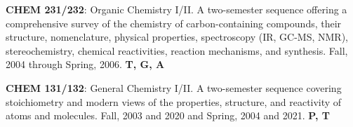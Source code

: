 \documentclass[10pt]{article}
\newcommand*\teitem[4]{\textbf{#1}: #2 #3 \textbf{#4}}
\newcommand*\lectitem[2]{\textbf{#1} #2}
\begin{document}

\teitem{CHEM 231/232}{Organic Chemistry I/II. A two-semester sequence offering a comprehensive survey of the chemistry of carbon-containing compounds, their structure, nomenclature, physical properties, spectroscopy (IR, GC-MS, NMR), stereochemistry, chemical reactivities, reaction mechanisms, and synthesis.}{Fall, 2004 through Spring, 2006.}{T, G, A}

\teitem{CHEM 131/132}{General Chemistry I/II.  A two-semester sequence covering stoichiometry and modern views of the properties, structure, and reactivity of atoms and molecules.}{Fall, 2003 and 2020 and Spring, 2004 and 2021.}{P, T}


\begin{comment}
\section{Invited Guest Lectures}

\lectitem{How Do You Know?}{University of Redlands Seminar. Department of Chemistry, University of Redlands, Redlands, California. January, 2020.}

\lectitem{Chemistry Through Computers.}{7th Grade Science Lecture. Blessed Sacrament Parish School, San Diego, California. January, 2015.}

\lectitem{Chemistry: College, Grad School, and Beyond.}{Guest Science Lecture. Citrus Valley High School, Redlands, California. May, 2012.}

\lectitem{Using Computers in Drug Discovery.}{University of Redlands Seminar. Department of Chemistry, University of Redlands, Redlands, California. January, 2011.}
\end{comment}

\end{document}
